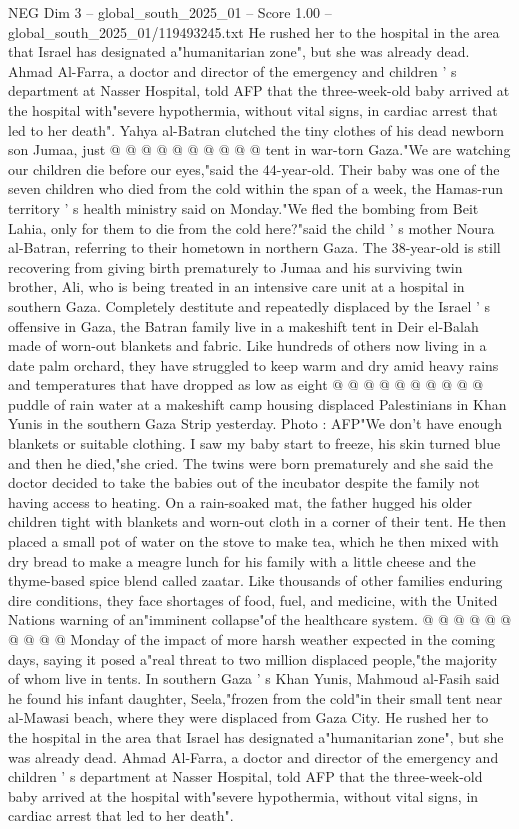 \begin{textsample}{NEG Dim 3 – global\_south\_2025\_01 – Score 1.00 – global\_south\_2025\_01/119493245.txt}
He rushed her to the hospital in the area that Israel has designated a"humanitarian zone", but she was already dead.
Ahmad Al-Farra, a doctor and director of the emergency and children ' s department at Nasser Hospital, told AFP that the three-week-old baby arrived at the hospital with"severe hypothermia, without vital signs, in cardiac arrest that led to her death".
Yahya al-Batran clutched the tiny clothes of his dead newborn son Jumaa, just @ @ @ @ @ @ @ @ @ @ tent in war-torn Gaza."We are watching our children die before our eyes,"said the 44-year-old.
Their baby was one of the seven children who died from the cold within the span of a week, the Hamas-run territory ' s health ministry said on Monday."We fled the bombing from Beit Lahia, only for them to die from the cold here?"said the child ' s mother Noura al-Batran, referring to their hometown in northern Gaza.
The 38-year-old is still recovering from giving birth prematurely to Jumaa and his surviving twin brother, Ali, who is being treated in an intensive care unit at a hospital in southern Gaza.
Completely destitute and repeatedly displaced by the Israel ' s offensive in Gaza, the Batran family live in a makeshift tent in Deir el-Balah made of worn-out blankets and fabric.
Like hundreds of others now living in a date palm orchard, they have struggled to keep warm and dry amid heavy rains and temperatures that have dropped as low as eight @ @ @ @ @ @ @ @ @ @ puddle of rain water at a makeshift camp housing displaced Palestinians in Khan Yunis in the southern Gaza Strip yesterday.
Photo : AFP"We don't have enough blankets or suitable clothing.
I saw my baby start to freeze, his skin turned blue and then he died,"she cried.
The twins were born prematurely and she said the doctor decided to take the babies out of the incubator despite the family not having access to heating.
On a rain-soaked mat, the father hugged his older children tight with blankets and worn-out cloth in a corner of their tent.
He then placed a small pot of water on the stove to make tea, which he then mixed with dry bread to make a meagre lunch for his family with a little cheese and the thyme-based spice blend called zaatar.
Like thousands of other families enduring dire conditions, they face shortages of food, fuel, and medicine, with the United Nations warning of an"imminent collapse"of the healthcare system. @ @ @ @ @ @ @ @ @ @ Monday of the impact of more harsh weather expected in the coming days, saying it posed a"real threat to two million displaced people,"the majority of whom live in tents.
In southern Gaza ' s Khan Yunis, Mahmoud al-Fasih said he found his infant daughter, Seela,"frozen from the cold"in their small tent near al-Mawasi beach, where they were displaced from Gaza City.
He rushed her to the hospital in the area that Israel has designated a"humanitarian zone", but she was already dead.
Ahmad Al-Farra, a doctor and director of the emergency and children ' s department at Nasser Hospital, told AFP that the three-week-old baby arrived at the hospital with"severe hypothermia, without vital signs, in cardiac arrest that led to her death".

\end{textsample}
